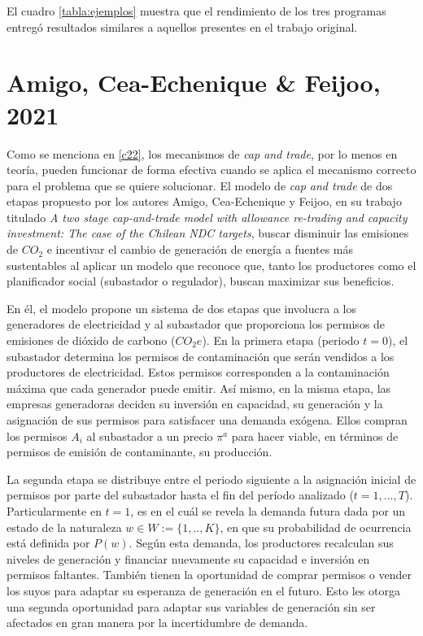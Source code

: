 El cuadro \ref{tabla:ejemplos} muestra que el rendimiento de los tres programas entregó resultados similares a aquellos presentes en el trabajo original.



\section{Amigo, Cea-Echenique \& Feijoo, 2021}

Como se menciona en \ref{c22}, los mecanismos de \textit{cap and trade}, por lo menos en teoría, pueden funcionar de forma efectiva cuando se aplica el mecanismo correcto para el problema que se quiere solucionar. El modelo de \textit{cap and trade} de dos etapas propuesto por los autores Amigo, Cea-Echenique y Feijoo, en su trabajo titulado \textit{A two stage cap-and-trade model with allowance re-trading and capacity investment: The case of the Chilean NDC targets}, buscar disminuir las emisiones de $CO_2$ e incentivar el cambio de generación de energía a fuentes más sustentables al aplicar un modelo que reconoce que, tanto los productores como el planificador social (subastador o regulador), buscan maximizar sus beneficios.
\vspace{2.5mm}

En él, el modelo propone un sistema de dos etapas que involucra a los generadores de electricidad y al subastador que proporciona los permisos de emisiones de dióxido de carbono ($CO_2 e$). En la primera etapa (periodo $t=0$), el subastador determina los permisos de contaminación que serán vendidos a los productores de electricidad. Estos permisos corresponden a la contaminación máxima que cada generador puede emitir. Así mismo, en la misma etapa, las empresas generadoras deciden su inversión en capacidad, su generación y la asignación de sus permisos para satisfacer una demanda exógena. Ellos compran los permisos $A_i$ al subastador a un precio $\pi^a$ para hacer viable, en términos de permisos de emisión de contaminante, su producción. 
\vspace{2.5mm}

La segunda etapa se distribuye entre el periodo siguiente a la asignación inicial de permisos por parte del subastador hasta el fin del período analizado ($t=1,...,T$). Particularmente en $t=1$, es en el cuál se revela la demanda futura dada por un estado de la naturaleza $w \in W :=\{ 1,..,K\}$, en que su probabilidad de ocurrencia está definida por $P(w)$. Según esta demanda, los productores recalculan sus niveles de generación y financiar nuevamente su capacidad e inversión en permisos faltantes. También tienen la oportunidad de comprar permisos o vender los suyos para adaptar su esperanza de generación en el futuro. Esto les otorga una segunda oportunidad para adaptar sus variables de generación sin ser afectados en gran manera por la incertidumbre de demanda.
\vspace{2.5mm}

